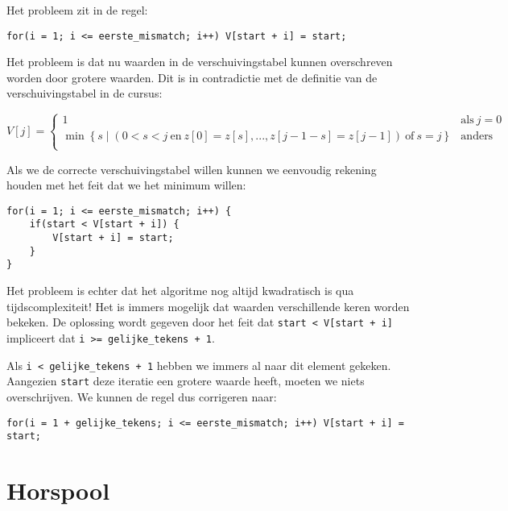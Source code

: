\documentclass[a4paper,11pt]{article}
\begin{document}
Het probleem zit in de regel:

\begin{verbatim}
for(i = 1; i <= eerste_mismatch; i++) V[start + i] = start;
\end{verbatim}

Het probleem is dat nu waarden in de verschuivingstabel kunnen overschreven
worden door grotere waarden. Dit is in contradictie met de definitie van de
verschuivingstabel in de cursus:

\begin{equation*}
V[j] = \left\{
    \begin{array}{ll}
        1 & \text{als} ~ j = 0 \\
        \min \left\{
            s \middle|
                (0 < s < j ~\text{en}~ z[0] = z[s], ..., z[j - 1- s] = z[j - 1])
                ~\text{of}~
                s = j
            \right\}
            & \text{anders}    \\
    \end{array}
    \right.
\end{equation*}

Als we de correcte verschuivingstabel willen kunnen we eenvoudig rekening houden
met het feit dat we het minimum willen:

\begin{verbatim}
for(i = 1; i <= eerste_mismatch; i++) {
    if(start < V[start + i]) {
        V[start + i] = start;
    }
}
\end{verbatim}

Het probleem is echter dat het algoritme nog altijd kwadratisch is qua
tijdscomplexiteit! Het is immers mogelijk dat waarden verschillende keren worden
bekeken. De oplossing wordt gegeven door het feit dat
\verb#start < V[start + i]# impliceert dat \verb#i >= gelijke_tekens + 1#.

Als \verb#i < gelijke_tekens + 1# hebben we immers al naar dit element gekeken.
Aangezien \verb#start# deze iteratie een grotere waarde heeft, moeten we niets
overschrijven. We kunnen de regel dus corrigeren naar:

\begin{verbatim}
for(i = 1 + gelijke_tekens; i <= eerste_mismatch; i++) V[start + i] = start;
\end{verbatim}

\section{Horspool}
\end{document}

